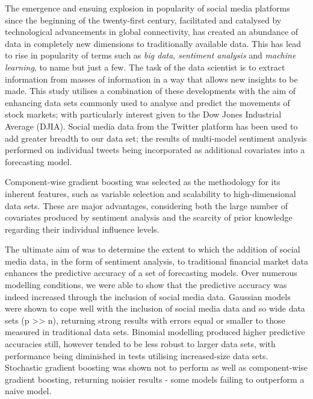\documentclass{article}
\begin{document}
The emergence and ensuing explosion in popularity of social media platforms since the beginning of the twenty-first century, facilitated and catalysed by technological advancements in global connectivity, has created an abundance of data in completely new dimensions to traditionally available data. This has lead to rise in popularity of terms such as \emph{big data}, \emph{sentiment analysis} and \emph{machine learning}, to name but just a few. The task of the data scientist is to extract information from masses of information in a way that allows new insights to be made. This study utilises a combination of these developments with the aim of enhancing data sets commonly used to analyse and predict the movements of stock markets; with particularly interest given to the Dow Jones Industrial Average (DJIA). Social media data from the Twitter platform has been used to add greater breadth to our data set; the results of multi-model sentiment analysis performed on individual tweets being incorporated as additional covariates into a forecasting model.

Component-wise gradient boosting was selected as the methodology for its inherent features, such as variable selection and scalability to high-dimensional data sets. These are major advantages, considering both the large number of covariates produced by sentiment analysis and the scarcity of prior knowledge regarding their individual influence levels.

The ultimate aim of was to determine the extent to which the addition of social media data, in the form of sentiment analysis, to traditional financial market data enhances the predictive accuracy of a set of forecasting models. Over numerous modelling conditions, we were able to show that the predictive accuracy was indeed increased through the inclusion of social media data. Gaussian models were shown to cope well with the inclusion of social media data and so wide data sets (p >> n), returning strong results with errors equal or smaller to those measured in traditional data sets. Binomial modelling produced higher predictive accuracies still, however tended to be less robust to larger data sets, with performance being diminished in tests utilising increased-size data sets. Stochastic gradient boosting was shown not to perform as well as component-wise gradient boosting, returning noisier results - some models failing to outperform a naive model.

\pagebreak


\pagebreak
\end{document}
